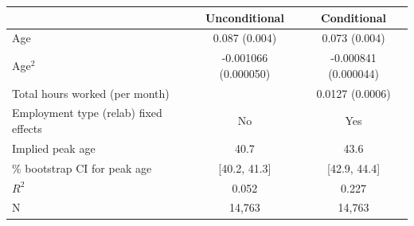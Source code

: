 
\begin{tabular}[t]{lcc}
\toprule
 & Unconditional & Conditional\\
\midrule
Age & 0.087 (0.004) & 0.073 (0.004)\\
Age$^2$ & -0.001066 (0.000050) & -0.000841 (0.000044)\\
Total hours worked (per month) &  & 0.0127 (0.0006)\\
Employment type (relab) fixed effects & No & Yes\\
\midrule
Implied peak age & 40.7 & 43.6\\
\addlinespace
95\% bootstrap CI for peak age & {}[40.2, 41.3] & {}[42.9, 44.4]\\
$R^2$ & 0.052 & 0.227\\
N & 14,763 & 14,763\\
\bottomrule
\end{tabular}
